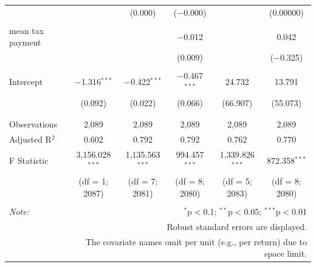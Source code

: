 \documentclass{article}
\begin{document}
\begin{tabular}{@{\extracolsep{.001pt}}lccccc}
  &  & (0.000) & ($-$0.000) &  & (0.00000) \\ 
  & & & & & \\ 
 mean tax payment &  &  & $-$0.012 &  & 0.042 \\ 
  &  &  & (0.009) &  & ($-$0.325) \\ 
  & & & & & \\ 
 Intercept & $-$1.316$^{***}$ & $-$0.422$^{***}$ & $-$0.467$^{***}$ & 24.732 & 13.791 \\ 
  & (0.092) & (0.022) & (0.066) & (66.907) & (55.073) \\ 
  & & & & & \\ 
\hline \\[-1.8ex] 
Observations & 2,089 & 2,089 & 2,089 & 2,089 & 2,089 \\ 
Adjusted R$^{2}$ & 0.602 & 0.792 & 0.792 & 0.762 & 0.770 \\ 
F Statistic & 3,156.028$^{***}$  & 1,135.563$^{***}$  & 994.457$^{***}$  & 1,339.826$^{***}$  & 872.358$^{***}$  \\ 
 & (df = 1; 2087) & (df = 7; 2081) & (df = 8; 2080) & (df = 5; 2083) & (df = 8; 2080) \\
\hline 
\hline \\[-1.8ex] 
\textit{Note:}  & \multicolumn{5}{r}{$^{*}$p$<$0.1; $^{**}$p$<$0.05; $^{***}$p$<$0.01} \\ 
 & \multicolumn{5}{r}{Robust standard errors are displayed.} \\ 
 & \multicolumn{5}{r}{The covariate names omit per unit (e.g., per return) due to space limit.} \\ 
\end{tabular} 
\endgroup 
\end{document}
